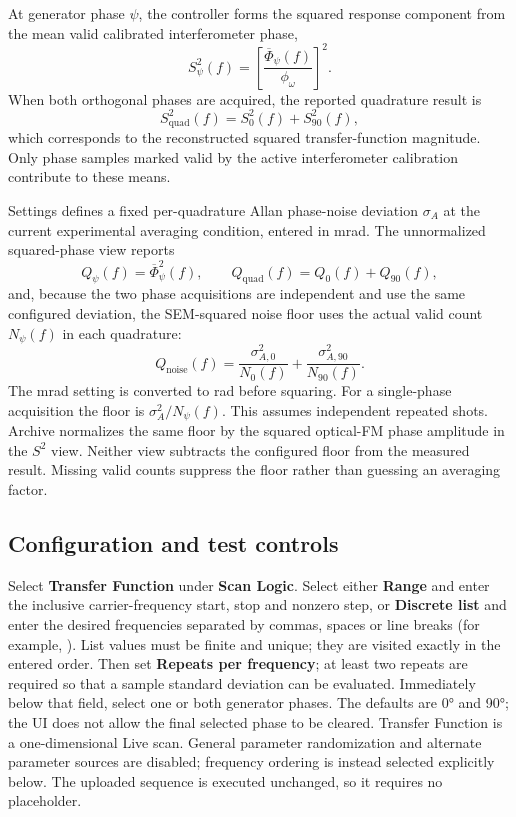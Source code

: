 \documentclass[11pt,oneside,openany]{book}
\newcommand{\code}[1]{\texttt{\detokenize{#1}}}
\newcommand{\ui}[1]{\textbf{#1}}
\begin{document}
At generator phase $\psi$, the controller forms the squared response component from the
mean valid calibrated interferometer phase,
\begin{equation}
  S_\psi^2(f)=\left[\frac{\overline{\Phi}_\psi(f)}{\phi_\omega}\right]^2.
  \label{eq:transfer-component}
\end{equation}
When both orthogonal phases are acquired, the reported quadrature result is
\begin{equation}
  S_{\mathrm{quad}}^2(f)=S_0^2(f)+S_{90}^2(f),
  \label{eq:transfer-quadrature}
\end{equation}
which corresponds to the reconstructed squared transfer-function magnitude. Only phase
samples marked valid by the active interferometer calibration contribute to these means.

Settings defines a fixed per-quadrature Allan phase-noise deviation $\sigma_A$ at the
current experimental averaging condition, entered in mrad. The unnormalized squared-phase
view reports
\begin{equation}
  Q_\psi(f)=\overline{\Phi}_\psi^2(f),\qquad
  Q_{\mathrm{quad}}(f)=Q_0(f)+Q_{90}(f),
\end{equation}
and, because the two phase acquisitions are independent and use the same configured
deviation, the SEM-squared noise floor uses the actual valid count $N_\psi(f)$ in each quadrature:
\begin{equation}
  Q_{\mathrm{noise}}(f)=\frac{\sigma_{A,0}^2}{N_0(f)}+\frac{\sigma_{A,90}^2}{N_{90}(f)}.
  \label{eq:transfer-noise-floor}
\end{equation}
The mrad setting is converted to rad before squaring. For a single-phase acquisition the
floor is $\sigma_A^2/N_\psi(f)$. This assumes independent repeated shots. Archive
normalizes the same floor by the squared optical-FM phase amplitude in the $S^2$ view.
Neither view subtracts the configured floor from the measured result. Missing valid
counts suppress the floor rather than guessing an averaging factor.

\subsection{Configuration and test controls}
Select \ui{Transfer Function} under \ui{Scan Logic}. Select either \ui{Range} and enter the
inclusive carrier-frequency start, stop and nonzero step, or \ui{Discrete list} and enter
the desired frequencies separated by commas, spaces or line breaks (for example,
\code{10.1, 20.1, 40.1}). List values must be finite and unique; they are visited exactly
in the entered order. Then set \ui{Repeats per frequency}; at least two repeats are
required so that a sample standard deviation can be evaluated. Immediately below that
field, select one or both generator phases. The defaults are \ang{0} and \ang{90}; the UI
does not allow the final selected phase to be cleared. Transfer Function is a
one-dimensional Live scan. General parameter randomization and alternate parameter
sources are disabled; frequency ordering is instead selected explicitly below. The
uploaded \code{.mot} sequence is executed unchanged, so it requires no
\code{PARAMETER} placeholder.
\end{document}
